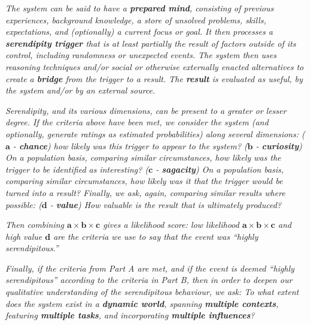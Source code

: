\begin{description}[itemsep=4pt]
\item[\emph{(\textbf{A - Definitional characteristics})}] \emph{The
  system can be said to have a \emph{\textbf{prepared mind}},
  consisting of previous experiences, background knowledge, a store of
  unsolved problems, skills, expectations, and (optionally) a current
  focus or goal.  It then processes a \emph{\textbf{serendipity
  trigger}} that is at least partially the result of factors outside
  of its control, including randomness or unexpected events.  The
  system then uses reasoning techniques and/or social or otherwise
  externally enacted alternatives to create a \emph{\textbf{bridge}}
  from the trigger to a result.  The \emph{\textbf{result}} is
  evaluated as useful, by the system and/or by an external source.}
\item[\emph{(\textbf{B - Dimensions})}] \emph{Serendipity, and its
  various dimensions, can be present to a greater or lesser degree.
  If the criteria above have been met, we consider the system (and optionally, generate ratings as
  estimated probabilities) along several dimensions:
%
\emph{($\mathbf{a}$ - \textbf{chance})} how likely was this trigger to appear to
  the system?
%
\emph{($\mathbf{b}$ - \textbf{curiosity})} On a population basis, comparing
  similar circumstances, how likely was the trigger to be identified
  as interesting?
%
\emph{($\mathbf{c}$ - \textbf{sagacity})} On a population basis, comparing
  similar circumstances, how likely was it that the trigger
  would be turned into a result?
%
Finally, we ask, again, comparing similar results where possible:
\emph{($\mathbf{d}$ - \textbf{value})} How valuable is the result that
is ultimately produced?}

\medskip

\emph{Then combining $\mathbf{a}\times\mathbf{b}\times\mathbf{c}$ gives a
  likelihood score: low likelihood $\mathbf{a}\times\mathbf{b}\times\mathbf{c}$ and high value $\mathbf{d}$ are the criteria we use to say that the event was ``highly serendipitous.''}

\item[\emph{(\textbf{C - Factors})}] \emph{Finally, if the criteria
  from Part A are met, and if the event is deemed ``highly
  serendipitous'' according to the criteria in Part B, then in order
  to deepen our qualitative understanding of the serendipitous
  behaviour, we ask: To what extent does the system exist in a
  \emph{\textbf{dynamic world}}, spanning \emph{\textbf{multiple
      contexts}}, featuring \emph{\textbf{multiple tasks}}, and
  incorporating \emph{\textbf{multiple influences}}?}
\end{description}

